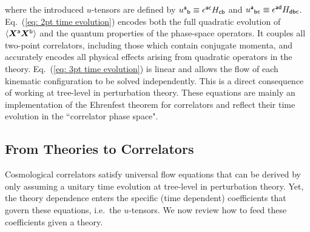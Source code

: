 \documentclass[11pt]{article}
\numberwithin{equation}{section} %
\begin{document}
where the introduced $u$-tensors are defined by $\tensor{u}{^{\sf{a}}}{_{\sf{b}}} \equiv \epsilon^{\sf{ac}}H_{\sf{cb}}$ and $\tensor{u}{^{\sf{a}}}{_{\sf{bc}}} \equiv \epsilon^{\sf{ad}} H_{\sf{dbc}}$. Eq.~(\ref{eq: 2pt time evolution}) encodes both the full quadratic evolution of $\langle \bm{X}^{\sf{a}}\bm{X}^{\sf{b}} \rangle$ and the quantum properties of the phase-space operators. It couples all two-point correlators, including those which contain conjugate momenta, and accurately encodes all physical effects arising from quadratic operators in the theory. Eq.~(\ref{eq: 3pt time evolution}) is linear and allows the flow of each kinematic configuration to be solved independently. This is a direct consequence of working at tree-level in perturbation theory. These equations are mainly an implementation of the Ehrenfest theorem for correlators and reflect their time evolution in the ``correlator phase space". 


\subsection{From Theories to Correlators}
\label{subsec: From Theories to Correlators}

Cosmological correlators satisfy universal flow equations that can be derived by only assuming a unitary time evolution at tree-level in perturbation theory. Yet, the theory dependence enters the specific (time dependent) coefficients that govern these equations, i.e.~the $u$-tensors. We now review how to feed these coefficients given a theory. 
\end{document}
